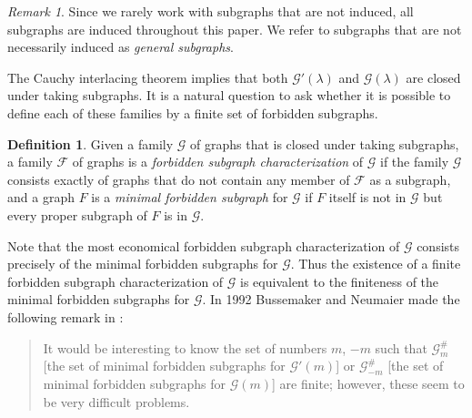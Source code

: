 \documentclass[11pt]{article}
\theoremstyle{definition}
\newtheorem{definition}[theorem]{Definition}
\theoremstyle{remark}
\newtheorem*{remark}{Remark}
\newcommand{\la}{\lambda}
\newcommand{\F}{\mathcal{F}}
\newcommand{\G}{\mathcal{G}}
\newcommand{\Gp}{\G'(\la)}
\newcommand{\Gl}{\G(\la)}
\begin{document}
\begin{remark}
    Since we rarely work with subgraphs that are not induced, all subgraphs are induced throughout this paper. We refer to subgraphs that are not necessarily induced as \emph{general subgraphs}.
\end{remark}

The Cauchy interlacing theorem implies that both $\Gp$ and $\Gl$ are closed under taking subgraphs. It is a natural question to ask whether it is possible to define each of these families by a finite set of forbidden subgraphs.

\begin{definition}
    Given a family $\G$ of graphs that is closed under taking subgraphs, a family $\F$ of graphs is a \emph{forbidden subgraph characterization} of $\G$ if the family $\G$ consists exactly of graphs that do not contain any member of $\F$ as a subgraph, and a graph $F$ is a \emph{minimal forbidden subgraph} for $\G$ if $F$ itself is not in $\G$ but every proper subgraph of $F$ is in $\G$.
\end{definition}

Note that the most economical forbidden subgraph characterization of $\G$ consists precisely of the minimal forbidden subgraphs for $\G$. Thus the existence of a finite forbidden subgraph characterization of $\G$ is equivalent to the finiteness of the minimal forbidden subgraphs for $\G$. In 1992 Bussemaker and Neumaier made the following remark in \cite[p~599]{BN92}:

\begin{quote}
    It would be interesting to know the set of numbers $m$, $-m$ such that $\mathcal{G}_m^\#$ [the set of minimal forbidden subgraphs for $\G'(m)$] or $\mathcal{G}_{-m}^\#$ [the set of minimal forbidden subgraphs for $\G(m)$] are finite; however, these seem to be very difficult problems.
\end{quote}
\end{document}
